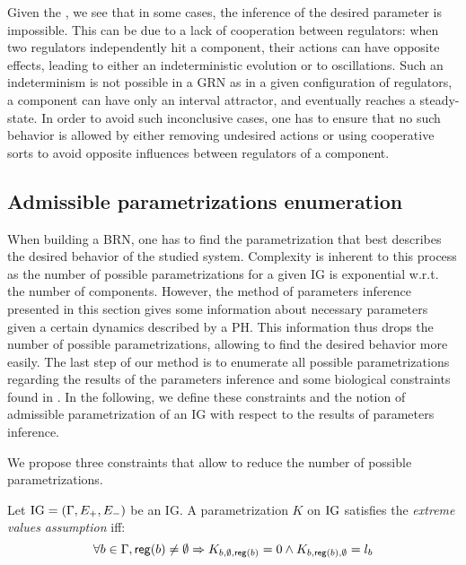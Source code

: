 Given the , we see that in some cases, the inference of the desired parameter is impossible. This can be due to a lack of cooperation between regulators: when two regulators independently hit a component, their actions can have opposite effects, leading to either an indeterministic evolution or to oscillations. Such an indeterminism is not possible in a GRN as in a given configuration of regulators, a component can have only an interval attractor, and eventually reaches a steady-state. In order to avoid such inconclusive cases, one has to ensure that no such behavior is allowed by either removing undesired actions or using cooperative sorts to avoid opposite influences between regulators of a component.

\subsection{Admissible parametrizations enumeration}
When building a BRN, one has to find the parametrization that best describes the desired behavior of the studied system. Complexity is inherent to this process as the number of possible parametrizations for a given IG is exponential w.r.t. the number of components. However, the method of parameters inference presented in this section gives some information about necessary parameters given a certain dynamics described by a PH. This information thus drops the number of possible parametrizations, allowing to find the desired behavior more easily. The last step of our method is to enumerate all possible parametrizations regarding the results of the parameters inference and some biological constraints found in \cite{BernotSemBRN}. In the following, we define these constraints and the notion of admissible parametrization of an IG with respect to the results of parameters inference.

We propose three constraints that allow to reduce the number of possible parametrizations.

\begin{property}
Let $\mathrm{IG} = (\Gamma, E_+, E_-)$ be an IG. A parametrization $K$ on $\mathrm{IG}$ satisfies the \emph{extreme values assumption} iff:
\label{prop:param_enum_extreme}
\[
  \forall b \in \Gamma, \mathsf{reg}({b}) \neq \emptyset \Rightarrow K_{b,\emptyset,\mathsf{reg}({b})} = 0 \wedge K_{b,\mathsf{reg}({b}),\emptyset} = l_b
\]
\end{property}

